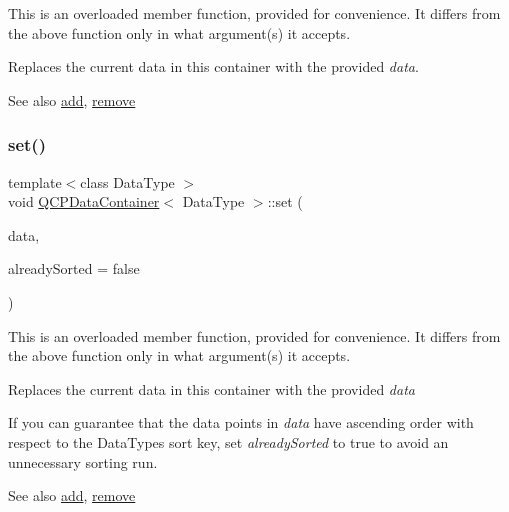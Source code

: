 This is an overloaded member function, provided for convenience. It differs from the above function only in what argument(s) it accepts.

Replaces the current data in this container with the provided {\itshape data}.

\begin{DoxySeeAlso}{See also}
\hyperlink{classQCPDataContainer_a42b98bd994307ccd163a43d576f91ad9}{add}, \hyperlink{classQCPDataContainer_ae5f569a120648b167efa78835f12fd38}{remove} 
\end{DoxySeeAlso}
\mbox{\label{classQCPDataContainer_aff99fffbb26597a354c4bc8312596ab2}} 
\subsubsection{\texorpdfstring{set()}{set()}\hspace{0.1cm}{\footnotesize\ttfamily [2/2]}}
{\footnotesize\ttfamily template$<$class Data\+Type $>$ \\
void \hyperlink{classQCPDataContainer}{Q\+C\+P\+Data\+Container}$<$ Data\+Type $>$\+::set (\begin{DoxyParamCaption}\item[{const Q\+Vector$<$ Data\+Type $>$ \&}]{data,  }\item[{bool}]{already\+Sorted = {\ttfamily false} }\end{DoxyParamCaption})}

This is an overloaded member function, provided for convenience. It differs from the above function only in what argument(s) it accepts.

Replaces the current data in this container with the provided {\itshape data} 

If you can guarantee that the data points in {\itshape data} have ascending order with respect to the Data\+Type\textquotesingle{}s sort key, set {\itshape already\+Sorted} to true to avoid an unnecessary sorting run.

\begin{DoxySeeAlso}{See also}
\hyperlink{classQCPDataContainer_a42b98bd994307ccd163a43d576f91ad9}{add}, \hyperlink{classQCPDataContainer_ae5f569a120648b167efa78835f12fd38}{remove} 
\end{DoxySeeAlso}
\mbox{\label{classQCPDataContainer_a233f866760a78950d2a393c1a4bc54b5}} 

